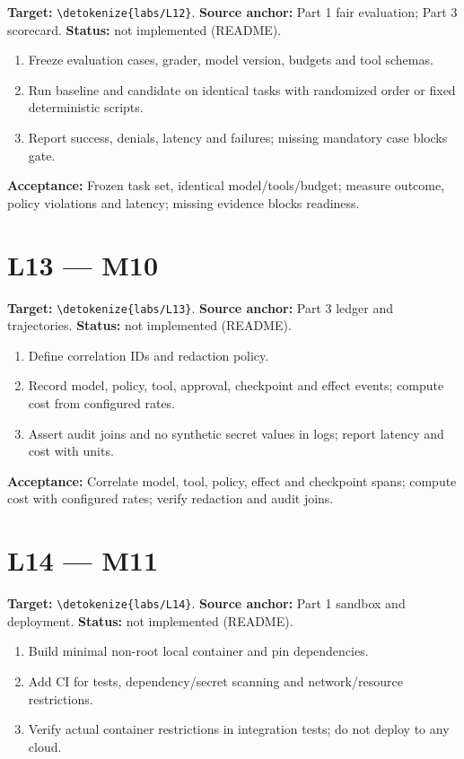 \documentclass[11pt,letterpaper]{article}
\newcommand{\src}[1]{\expandafter\nolinkurl\expandafter{\detokenize{#1}}}
\begin{document}
\textbf{Target:} \src{labs/L12}. \textbf{Source anchor:} Part 1 fair evaluation; Part 3 scorecard. \textbf{Status:} not implemented (README).

\begin{enumerate}
\item Freeze evaluation cases, grader, model version, budgets and tool schemas.
\item Run baseline and candidate on identical tasks with randomized order or fixed deterministic scripts.
\item Report success, denials, latency and failures; missing mandatory case blocks gate.
\end{enumerate}

\textbf{Acceptance:} Frozen task set, identical model/tools/budget; measure outcome, policy violations and latency; missing evidence blocks readiness.

\section{L13 --- M10}

\textbf{Target:} \src{labs/L13}. \textbf{Source anchor:} Part 3 ledger and trajectories. \textbf{Status:} not implemented (README).

\begin{enumerate}
\item Define correlation IDs and redaction policy.
\item Record model, policy, tool, approval, checkpoint and effect events; compute cost from configured rates.
\item Assert audit joins and no synthetic secret values in logs; report latency and cost with units.
\end{enumerate}

\textbf{Acceptance:} Correlate model, tool, policy, effect and checkpoint spans; compute cost with configured rates; verify redaction and audit joins.

\section{L14 --- M11}

\textbf{Target:} \src{labs/L14}. \textbf{Source anchor:} Part 1 sandbox and deployment. \textbf{Status:} not implemented (README).

\begin{enumerate}
\item Build minimal non-root local container and pin dependencies.
\item Add CI for tests, dependency/secret scanning and network/resource restrictions.
\item Verify actual container restrictions in integration tests; do not deploy to any cloud.
\end{enumerate}
\end{document}
